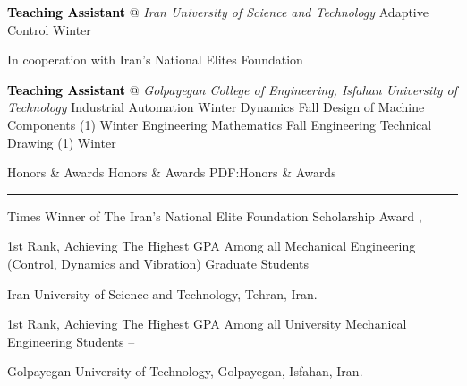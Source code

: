 \documentclass[letterpaper,MMMyyyy]{CVTemplate}
\begin{document}
\begin{Body}

\Entry
\textcolor{black}{\textbf{Teaching Assistant}} @ \textit{Iran University of Science and Technology}
\Gap
\BulletItem
Adaptive Control
\hfill
\textcolor{OrangeY}{Winter }
\begin{Detail}
	\qquad In cooperation with Iran's National Elites Foundation
\end{Detail}



\vspace{6pt}
\Entry
\textcolor{black}{\textbf{Teaching Assistant}} @ \textit{Golpayegan College of Engineering, Isfahan University of Technology}
\Gap
\BulletItem
Industrial Automation
\hfill
\textcolor{OrangeY}{Winter }
\BulletItem
Dynamics
\hfill
\textcolor{OrangeY}{Fall }
\BulletItem
Design of Machine Components (1)
\hfill
\textcolor{OrangeY}{Winter }
\BulletItem
Engineering Mathematics 
\hfill
\textcolor{OrangeY}{Fall }
\BulletItem
Engineering Technical Drawing (1) 
\hfill
\textcolor{OrangeY}{Winter }

\Section
{Honors \& Awards}
{Honors \& Awards}
{PDF:Honors \& Awards}
\textcolor{Forestg}{\vspace{0.10cm}\hrule height 0.1cm}\BigGap\Gap
\Gap
{} Times Winner of The Iran's National Elite Foundation Scholarship Award
 \hfill
\textcolor{OrangeY}{, }
\vspace{6pt}

\Gap
\vspace{6pt}
\BulletItem
1st Rank, Achieving The Highest GPA Among all Mechanical Engineering (Control, Dynamics and Vibration) Graduate Students
\hfill
\textcolor{OrangeY}{}
\begin{Detail}
	\Item
	Iran University of Science and Technology, Tehran, Iran.
\end{Detail}

\Gap
\vspace{6pt}
\BulletItem
1st Rank, Achieving The Highest GPA Among all University Mechanical Engineering Students
\hfill
\textcolor{OrangeY}{ -- }
\begin{Detail}
	\Item
	Golpayegan University of Technology, Golpayegan, Isfahan, Iran.
\end{Detail}


\end{Body}
\end{document}
